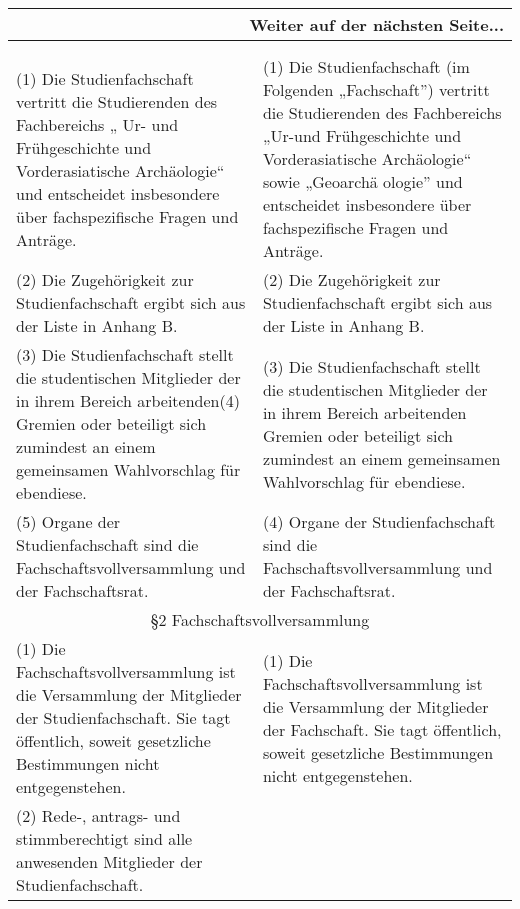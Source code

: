 {\begin{longtable}{|p{7.5cm}|p{7.5cm}|}
        \hline
        \endhead
        \hline
        \multicolumn{2}{|r|}{Weiter auf der nächsten Seite...}\\
        \hline
        \endfoot
        \hline
        \multicolumn{2}{c}{Ende der Synopse} \\
        \endlastfoot
        \multicolumn{2}{|c|}{§1 Allgemeines}\\\hline
        (1)  Die Studienfachschaft vertritt die Studierenden des Fachbereichs „ Ur-
        und  Frühgeschichte und Vorderasiatische Archäologie“ und entscheidet insbesondere
        über fachspezifische Fragen und Anträge.&
        (1)  Die Studienfachschaft (im Folgenden „Fachschaft”) vertritt die Studierenden des
        Fachbereichs „Ur-und Frühgeschichte und Vorderasiatische Archäologie“ sowie „Geoarchä
        ologie” und entscheidet insbesondere über fachspezifische Fragen und Anträge.\\
        (2)  Die Zugehörigkeit zur Studienfachschaft ergibt sich aus der Liste in
        Anhang B.&
        (2)  Die Zugehörigkeit zur Studienfachschaft ergibt sich aus der Liste in Anhang B.\\
        (3)  Die Studienfachschaft stellt die studentischen Mitglieder der in ihrem
        Bereich arbeitenden\newline (4) Gremien oder beteiligt sich zumindest an einem gemeinsamen
        Wahlvorschlag für ebendiese. &
        (3)  Die Studienfachschaft stellt die studentischen Mitglieder der in ihrem Bereich
        arbeitenden Gremien oder beteiligt sich zumindest an einem gemeinsamen Wahlvorschlag
        für ebendiese.\\
        (5) Organe der Studienfachschaft sind die Fachschaftsvollversammlung und der
        Fachschaftsrat. &
        (4)  Organe der Studienfachschaft sind die Fachschaftsvollversammlung und der
        Fachschaftsrat.\\
        \hline
        \multicolumn{2}{|c|}{§2 Fachschaftsvollversammlung}\\\hline
        (1)  Die Fachschaftsvollversammlung ist die Versammlung der Mitglieder der
        Studienfachschaft. Sie tagt öffentlich, soweit gesetzliche Bestimmungen nicht
        entgegenstehen.&
        (1)  Die Fachschaftsvollversammlung ist die Versammlung der Mitglieder der
        Fachschaft.  Sie tagt öffentlich, soweit gesetzliche Bestimmungen nicht
        entgegenstehen.\\
        (2) Rede-, antrags- und stimmberechtigt sind alle anwesenden Mitglieder der
        Studienfachschaft.&

\end{longtable}}
